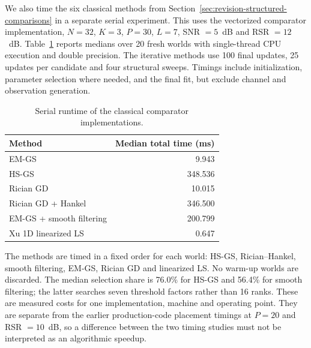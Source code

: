 
We also time the six classical methods from
Section~\ref{sec:revision-structured-comparisons} in a separate serial
experiment. This uses the vectorized comparator implementation,
$N=32$, $K=3$, $P=30$, $L=7$, SNR $=5$~dB and RSR $=12$~dB.
Table~\ref{tab:revision-serial} reports medians over 20 fresh worlds with
single-thread CPU execution and double precision. The iterative methods
use 100 final updates, 25 updates per candidate and four structural
sweeps. Timings include initialization, parameter selection where needed,
and the final fit, but exclude channel and observation generation.

\begin{table}[!t]
\caption{Serial runtime of the classical comparator implementations.}
\label{tab:revision-serial}
\centering
\footnotesize
\begin{tabular}{lr}
\toprule
Method & Median total time (ms)\\
\midrule
EM-GS & 9.943\\
HS-GS & 348.536\\
Rician GD & 10.015\\
Rician GD + Hankel & 346.500\\
EM-GS + smooth filtering & 200.799\\
Xu 1D linearized LS & 0.647\\
\bottomrule
\end{tabular}
\end{table}

The methods are timed in a fixed order for each world: HS-GS,
Rician--Hankel, smooth filtering, EM-GS, Rician GD and linearized LS.
No warm-up worlds are discarded. The median selection share is 76.0\%
for HS-GS and 56.4\% for smooth filtering; the latter searches seven
threshold factors rather than 16 ranks. These are measured costs for one
implementation, machine and operating point.
They are separate from the earlier production-code placement timings at
$P=20$ and RSR $=10$~dB, so a difference between the two timing studies
must not be interpreted as an algorithmic speedup.
